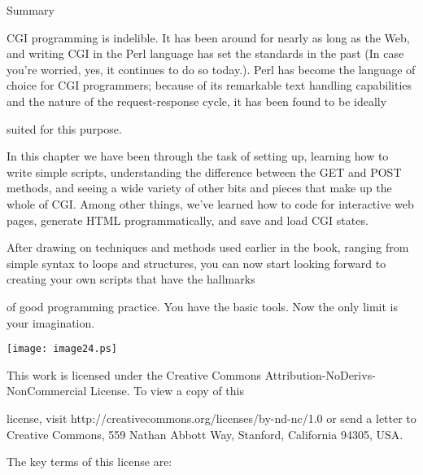 \documentclass[a4paper,11pt]{book}
\begin{document}
\noindent 

\noindent Summary

\noindent 

\noindent CGI  programming  is  indelible.  It  has  been  around  for  nearly  as  long  as  the Web,  and  writing  CGI  in the Perl  language has set the standards  in  the  past  (In  case  you're  worried,  yes,  it  continues  to  do  so today.).  Perl has  become the  language  of  choice  for  CGI  programmers;  because  of  its remarkable  text handling  capabilities and the nature  of the  request-response  cycle,  it  has been  found  to  be  ideally

\noindent suited for this purpose.

\noindent 

\noindent In  this  chapter we  have been through the task of setting up, learning how to write simple scripts, understanding the difference between the GET and POST methods, and seeing a wide variety of other bits and pieces that make up the whole of CGI. Among other things, we've learned how to code for interactive web pages, generate HTML programmatically, and save and load CGI states.

\noindent 

\noindent After drawing on techniques and methods used earlier in the book, ranging from simple syntax to loops and structures, you can now start looking forward to creating your own scripts that have the hallmarks

\noindent of good programming practice. You have the basic tools. Now the only limit is your imagination.

\noindent  

\noindent  

\noindent  

\noindent  

\noindent 

\noindent \texttt{[image: image24.ps]}

\noindent 

\noindent This work is licensed under the Creative Commons Attribution-NoDerivs-NonCommercial License. To view a copy of this

\noindent license, visit http://creativecommons.org/licenses/by-nd-nc/1.0 or send a letter to Creative Commons, 559 Nathan Abbott Way, Stanford, California 94305, USA.

\noindent 

\noindent The key terms of this license are:
\end{document}
